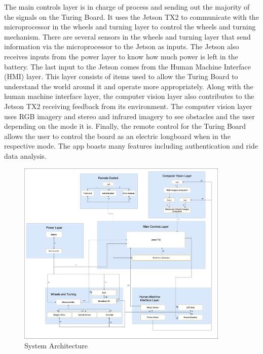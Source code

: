 The main controls layer is in charge of process and sending out the majority of the signals on the Turing Board. It uses the Jetson TX2 to communicate with the microprocessor in the wheels and turning layer to control the wheels and turning mechanism. There are several sensors in the wheels and turning layer that send information via the microprocessor to the Jetson as inputs. The Jetson also receives inputs from the power layer to know how much power is left in the battery. The last input to the Jetson comes from the Human Machine Interface (HMI) layer. This layer consists of items used to allow the Turing Board to understand the world around it and operate more appropriately. Along with the human machine interface layer, the computer vision layer also contributes to the Jetson TX2 receiving feedback from its environment. The computer vision layer uses RGB imagery and stereo and infrared imagery to see obstacles and the user depending on the mode it is. Finally, the remote control for the Turing Board allows the user to control the board as an electric longboard when in the respective mode. The app boasts many features including authentication and ride data analysis.

\begin{figure}[h!]
	\centering
 	\includegraphics[width=0.90\textwidth]{images/data_flow} %
 \caption{System Architecture}
\end{figure}
